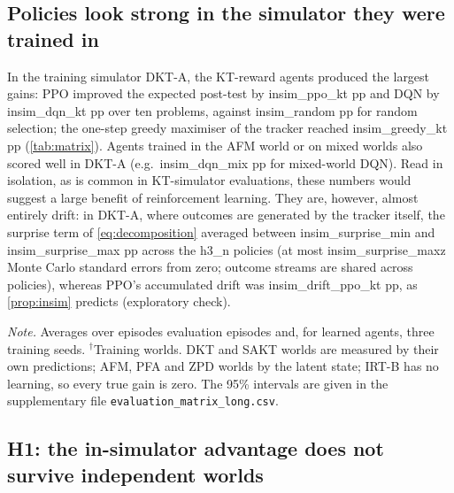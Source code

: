 \subsection{Policies look strong in the simulator they were trained in}\label{sec:res-insim}

In the training simulator DKT-A, the KT-reward agents produced the largest gains: PPO improved the expected post-test by {{insim_ppo_kt}} pp and DQN by {{insim_dqn_kt}} pp over ten problems, against {{insim_random}} pp for random selection; the one-step greedy maximiser of the tracker reached {{insim_greedy_kt}} pp (\cref{tab:matrix}). Agents trained in the AFM world or on mixed worlds also scored well in DKT-A (e.g.\ {{insim_dqn_mix}} pp for mixed-world DQN). Read in isolation, as is common in KT-simulator evaluations, these numbers would suggest a large benefit of reinforcement learning. They are, however, almost entirely drift: in DKT-A, where outcomes are generated by the tracker itself, the surprise term of \cref{eq:decomposition} averaged between {{insim_surprise_min}} and {{insim_surprise_max}} pp across the {{h3_n}} policies (at most {{insim_surprise_maxz}} Monte Carlo standard errors from zero; outcome streams are shared across policies), whereas PPO's accumulated drift was {{insim_drift_ppo_kt}} pp, as \cref{prop:insim} predicts (exploratory check).

\begin{table}[t]
\centering
\caption{World-measured post-test gain (percentage points over ten problems) of every policy in every evaluation world.}
\label{tab:matrix}
\footnotesize
{}
\par\smallskip
\begin{minipage}{\textwidth}\footnotesize
\textit{Note.} Averages over {{episodes}} evaluation episodes and, for learned agents, three training seeds. $^\dagger$Training worlds. DKT and SAKT worlds are measured by their own predictions; AFM, PFA and ZPD worlds by the latent state; IRT-B has no learning, so every true gain is zero. The 95\% intervals are given in the supplementary file \texttt{evaluation\_matrix\_long.csv}.
\end{minipage}
\end{table}

\subsection{H1: the in-simulator advantage does not survive independent worlds}\label{sec:res-h1}

